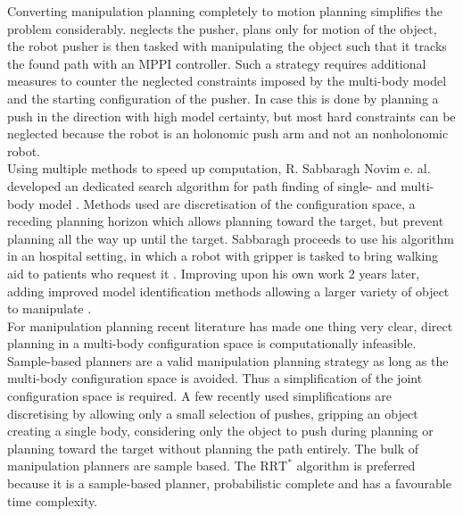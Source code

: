 Converting manipulation planning completely to motion planning simplifies the problem considerably. \cite{arruda_uncertainty_2017} neglects the pusher, plans only for motion of the object, the robot pusher is then tasked with manipulating the object such that it tracks the found path with an \ac{MPPI} controller. Such a strategy requires additional measures to counter the neglected constraints imposed by the multi-body model and the starting configuration of the pusher. In \cite{arruda_uncertainty_2017} case this is done by planning a push in the direction with high model certainty, but most hard constraints can be neglected because the robot is an holonomic push arm and not an nonholonomic robot. \\

Using multiple methods to speed up computation, R. Sabbaragh Novim e. al. developed an dedicated search algorithm for path finding of single- and multi-body model \cite{sabbagh_novin_optimal_2016}.  Methods used are discretisation of the configuration space, a receding planning horizon which allows planning toward the target, but prevent planning all the way up until the target. Sabbaragh proceeds to use his algorithm in an hospital setting, in which a robot with gripper is tasked to bring walking aid to patients who request it \cite{novin_dynamic_2018}. Improving upon his own work 2 years later, adding improved model identification methods allowing a larger variety of object to manipulate \cite{sabbagh_novin_model_2021}.\\

For manipulation planning recent literature has made one thing very clear, direct planning in a multi-body configuration space is computationally infeasible. Sample-based planners are a valid manipulation planning strategy as long as the multi-body configuration space is avoided. Thus a simplification of the joint configuration space is required. A few recently used simplifications are discretising by allowing only a small selection of pushes, gripping an object creating a single body, considering only the object to push during planning or planning toward the target without planning the path entirely. The bulk of manipulation planners are sample based. The $\text{RRT}^*$ algorithm is preferred because it is a sample-based planner, probabilistic complete and has a favourable time complexity. 

